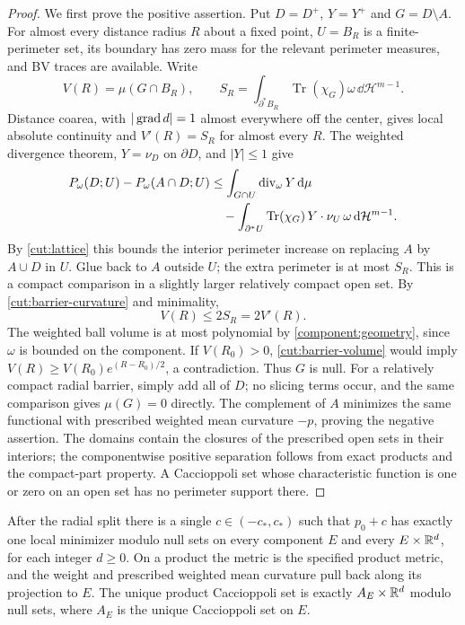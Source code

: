 \begin{proof}
We first prove the positive assertion.  Put $D=D^+$, $Y=Y^+$ and
$G=D\setminus A$.  For almost every distance radius $R$ about a fixed
point, $U=B_R$ is a finite-perimeter set, its boundary has zero mass for
the relevant perimeter measures, and BV traces are available.  Write
\[
 V(R)=\mu(G\cap B_R),\qquad
 S_R=\int_{\partial^*B_R}\operatorname{Tr}(\chi_G)\omega\,
                  \dd\mathcal H^{m-1}.
\]
Distance coarea, with $|\operatorname{grad} d|=1$ almost everywhere off the center,
gives local absolute continuity and $V'(R)=S_R$ for almost every $R$.
The weighted divergence theorem, $Y=\nu_D$ on $\partial D$, and $|Y|\le1$ give
\begin{align*}
 P_\omega(D;U)-P_\omega(A\cap D;U)
 &\le\int_{G\cap U}\operatorname{div}_\omega Y\,\mathrm d\mu\\
 &\quad-\int_{\partial^*U}
             \operatorname{Tr}(\chi_G)\,Y\cdot\nu_U\,
                         \omega\,\mathrm d\mathcal H^{m-1}.
\end{align*}
By \eqref{cut:lattice} this bounds the interior perimeter increase on
replacing $A$ by $A\cup D$ in $U$.  Glue back to $A$ outside $U$; the
extra perimeter is at most $S_R$.  This is a compact comparison in a
slightly larger relatively compact open set.  By
\eqref{cut:barrier-curvature} and minimality,
\begin{equation}\label{cut:barrier-volume}
                         V(R)\le2S_R=2V'(R).
\end{equation}
The weighted ball volume is at most polynomial by
\cref{component:geometry}, since $\omega$ is bounded on the component.
If $V(R_0)>0$, \eqref{cut:barrier-volume} would imply
$V(R)\ge V(R_0)e^{(R-R_0)/2}$, a contradiction.  Thus $G$ is null.
For a relatively compact radial barrier, simply add all of $D$; no
slicing terms occur, and the same comparison gives $\mu(G)=0$ directly.
The complement of $A$ minimizes the same functional with prescribed
weighted mean curvature $-p$, proving the negative
assertion.  The domains contain the closures of the prescribed open sets in their interiors;
the componentwise positive separation follows from exact products and the
compact-part property.  A Caccioppoli set whose characteristic function is one or zero on an
open set has
no perimeter support there.
\end{proof}

\begin{proposition}
\label{cut:generic-uniqueness}
After the radial split there is a single $c\in(-c_*,c_*)$ such
that $p_0+c$ has exactly one local minimizer modulo null
sets on every component $E$ and every $E\times\mathbb R^d$, for each integer
$d\ge0$. On a product the metric is the specified product metric,
and the weight and prescribed weighted mean curvature pull back along its projection to $E$.  The unique product Caccioppoli set
is exactly $A_E\times\mathbb R^d$ modulo null sets, where $A_E$ is the unique
Caccioppoli set on $E$.
\end{proposition}

